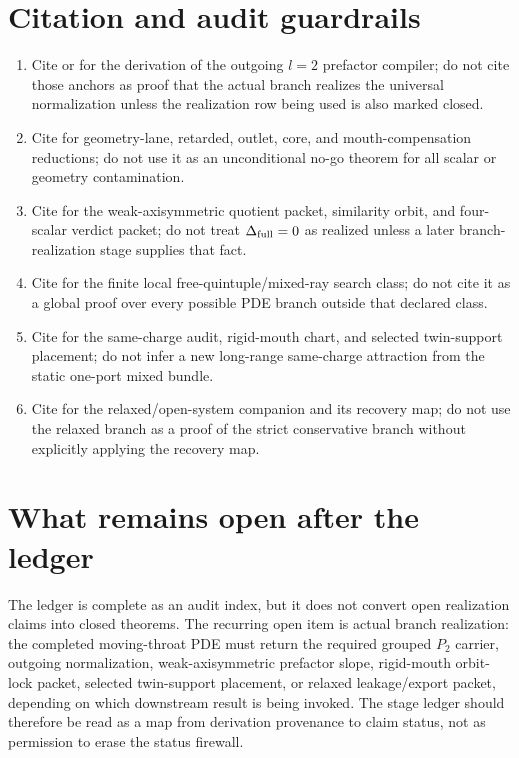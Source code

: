 \section{Citation and audit guardrails}
\label{sec:stage-ledger-guardrails}

\begin{enumerate}[leftmargin=2.4em]
\item Cite  or  for the derivation of the outgoing \(l=2\) prefactor compiler; do not cite those anchors as proof that the actual branch realizes the universal normalization unless the realization row being used is also marked closed.
\item Cite  for geometry-lane, retarded, outlet, core, and mouth-compensation reductions; do not use it as an unconditional no-go theorem for all scalar or geometry contamination.
\item Cite  for the weak-axisymmetric quotient packet, similarity orbit, and four-scalar verdict packet; do not treat \(\Delta_{\rm full}=0\) as realized unless a later branch-realization stage supplies that fact.
\item Cite  for the finite local free-quintuple/mixed-ray search class; do not cite it as a global proof over every possible PDE branch outside that declared class.
\item Cite  for the same-charge audit, rigid-mouth chart, and selected twin-support placement; do not infer a new long-range same-charge attraction from the static one-port mixed bundle.
\item Cite  for the relaxed/open-system companion and its recovery map; do not use the relaxed branch as a proof of the strict conservative branch without explicitly applying the recovery map.
\end{enumerate}

\section{What remains open after the ledger}
\label{sec:stage-ledger-open-items}

The ledger is complete as an audit index, but it does not convert open realization claims into closed theorems.  The recurring open item is actual branch realization: the completed moving-throat PDE must return the required grouped \(P_2\) carrier, outgoing normalization, weak-axisymmetric prefactor slope, rigid-mouth orbit-lock packet, selected twin-support placement, or relaxed leakage/export packet, depending on which downstream result is being invoked.  The stage ledger should therefore be read as a map from derivation provenance to claim status, not as permission to erase the status firewall.
